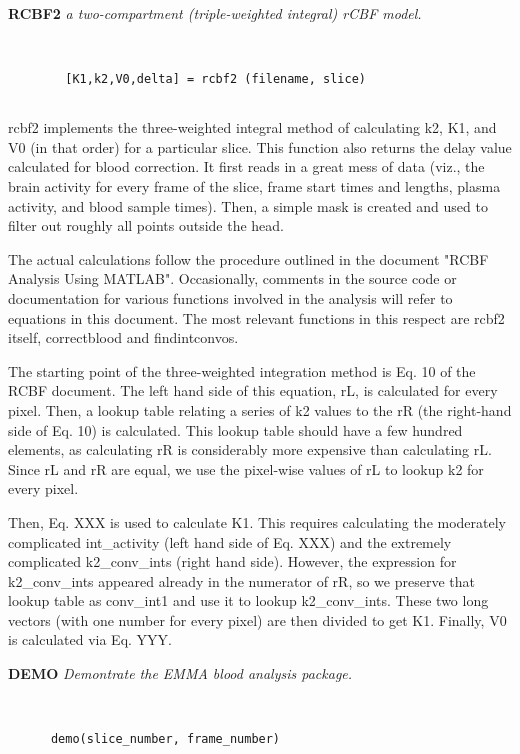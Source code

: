 
{\large\bf RCBF2} {\em a two-compartment (triple-weighted integral) rCBF model.}
\begin{verbatim}


        [K1,k2,V0,delta] = rcbf2 (filename, slice)


\end{verbatim}

  rcbf2 implements the three-weighted integral method of calculating
  k2, K1, and V0 (in that order) for a particular slice.  This
  function also returns the delay value calculated for blood
  correction.  It first reads in a great mess of data (viz., the brain
  activity for every frame of the slice, frame start times and
  lengths, plasma activity, and blood sample times).  Then, a simple
  mask is created and used to filter out roughly all points outside
  the head.
  
  The actual calculations follow the procedure outlined in the
  document "RCBF Analysis Using MATLAB".  Occasionally, comments in
  the source code or documentation for various functions involved in
  the analysis will refer to equations in this document.  The most
  relevant functions in this respect are rcbf2 itself, correctblood
  and findintconvos.
  
  The starting point of the three-weighted integration method is Eq.
  10 of the RCBF document.  The left hand side of this equation, rL,
  is calculated for every pixel.  Then, a lookup table relating a
  series of k2 values to the rR (the right-hand side of Eq. 10) is
  calculated.  This lookup table should have a few hundred elements,
  as calculating rR is considerably more expensive than calculating
  rL.  Since rL and rR are equal, we use the pixel-wise values of rL
  to lookup k2 for every pixel.
  
  Then, Eq. XXX is used to calculate K1.  This requires calculating
  the moderately complicated int\_activity (left hand side of Eq. XXX)
  and the extremely complicated k2\_conv\_ints (right hand side).
  However, the expression for k2\_conv\_ints appeared already in the
  numerator of rR, so we preserve that lookup table as conv\_int1 and
  use it to lookup k2\_conv\_ints.  These two long vectors (with one
  number for every pixel) are then divided to get K1.  Finally, V0 is
  calculated via Eq. YYY.
\newpage


{\large\bf DEMO} {\em  Demontrate the EMMA blood analysis package.}
\begin{verbatim}


      demo(slice_number, frame_number)


\end{verbatim}

